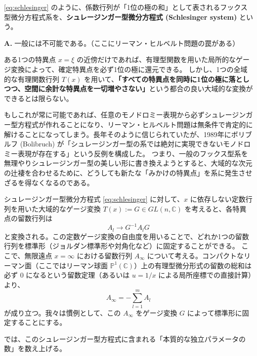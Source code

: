 \begin{definition}[シュレージンガー型微分方程式]
    \eqref{eq:schlesinger} のように、係数行列が「1位の極の和」として表されるフックス型微分方程式系を、\textbf{シュレージンガー型微分方程式 (Schlesinger system)} という。
\end{definition}

\begin{Q}
\textbf{A.} 一般には不可能である。（ここにリーマン・ヒルベルト問題の罠がある）

ある1つの特異点 $x=\xi$ の近傍だけであれば、有理型関数を用いた局所的なゲージ変換によって、確定特異点を必ず1位の極に還元できる。
しかし、1つの全域的な有理関数行列 $T(x)$ を用いて、\textbf{「すべての特異点を同時に1位の極に落としつつ、空間に余計な特異点を一切増やさない」}という都合の良い大域的な変換ができるとは限らない。

もしこれが常に可能であれば、任意のモノドロミー表現から必ずシュレージンガー型方程式が作れることになり、リーマン・ヒルベルト問題は無条件で肯定的に解けることになってしまう。長年そのように信じられていたが、1989年にボリブルフ (Bolibruch) が「シュレージンガー型の系では絶対に実現できないモノドロミー表現が存在する」という反例を構成した。
つまり、一般のフックス型系を無理やりシュレージンガー型の美しい形に書き換えようとすると、大域的な次元の辻褄を合わせるために、どうしても新たな「みかけの特異点」を系に発生させざるを得なくなるのである。
\end{Q}

シュレージンガー型微分方程式 \eqref{eq:schlesinger} に対して、$x$ に依存しない定数行列を用いた大域的なゲージ変換 $T(x) := G \in GL(n, \mathbb{C})$ を考えると、各特異点の留数行列は
\[
A_{l} \to G^{-1}A_{l}G
\]
と変換される。この定数ゲージ変換の自由度を用いることで、どれか1つの留数行列を標準形（ジョルダン標準形や対角化など）に固定することができる。
ここで、無限遠点 $x=\infty$ における留数行列 $A_{\infty}$ について考える。コンパクトなリーマン面（ここではリーマン球面 $\mathbb{P}^{1}(\mathbb{C})$）上の有理型微分形式の留数の総和は必ず $0$ になるという留数定理（あるいは $u=1/x$ による局所座標での直接計算）より、
\[
A_{\infty} = -\sum_{l=1}^{m}A_{l}
\]
が成り立つ。我々は慣例として、この $A_{\infty}$ をゲージ変換 $G$ によって標準形に固定することにする。

では、このシュレージンガー型方程式に含まれる「本質的な独立パラメータの数」を数え上げる。

